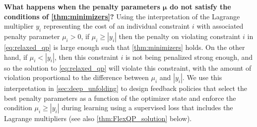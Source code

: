 \documentclass{article} %
\begin{document}
\textbf{What happens when the penalty parameters $\boldsymbol{\mu}$ do not satisfy the conditions of \cref{thm:minimizers}?}
Using the interpretation of the Lagrange multiplier $y_i$ representing the cost of an individual constraint $i$ with associated penalty parameter $\mu_i > 0$, if $\mu_i \geq |y_i|$ then the penalty on violating constraint $i$ in \cref{eq:relaxed_qp} is large enough such that \cref{thm:minimizers} holds. On the other hand, if $\mu_i < |y_i|$, then this constraint $i$ is not being penalized strong enough, and so the solution to \cref{eq:relaxed_qp} will violate this constraint, with the amount of violation proportional to the difference between $\mu_i$ and $|y_i|$. We use this interpretation in \cref{sec:deep_unfolding} to design feedback policies that select the best penalty parameters as a function of the optimizer state and enforce the condition $\mu_i \geq |y_i|$ during learning using a supervised loss that includes the Lagrange multipliers (see also \cref{thm:FlexQP_solution} below).
\end{document}
